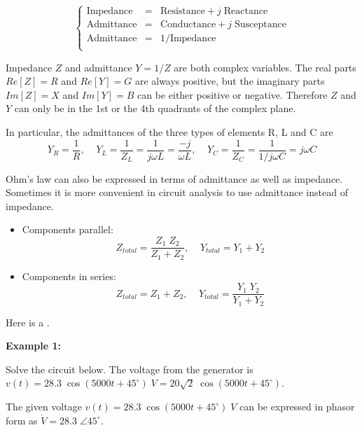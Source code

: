 \documentclass{article}
\begin{document}
\begin{equation}
  \left\{\begin{array}{rcl}
  \mbox{Impedance} &=& \mbox{Resistance} + j \;\mbox{Reactance} \\
  \mbox{Admittance} &=& \mbox{Conductance} + j\; \mbox{Susceptance} \\
  \mbox{Admittance}&=&1/\mbox{Impedance}\\
  \end{array}\right.
\end{equation}

Impedance $Z$ and admittance $Y=1/Z$ are both complex variables. The 
real parts $Re[Z]=R$ and $Re[Y]=G$ are always positive, but the imaginary 
parts $Im[Z]=X$ and $Im[Y]=B$ can be either positive or negative. Therefore
$Z$ and $Y$ can only be in the 1st or the 4th quadrants of the complex plane.

In particular, the admittances of the three types of elements R, L
and C are
\begin{equation}
  Y_R=\frac{1}{R},\;\;\;\;
  Y_L=\frac{1}{Z_L}=\frac{1}{j\omega L}=\frac{-j}{\omega L},\;\;\;\;
  Y_C=\frac{1}{Z_C}=\frac{1}{1/j\omega C}=j\omega C	
\end{equation}

Ohm's law can also be expressed in terms of admittance as well as 
impedance. Sometimes it is more convenient in circuit analysis to use 
admittance instead of impedance.
\begin{itemize}
\item Components parallel:
  \begin{equation} 
    Z_{total}=\frac{Z_1\;Z_2}{Z_1+Z_2},\;\;\;\;Y_{total}=Y_1+Y_2 
  \end{equation}
\item Components in series:
  \begin{equation}
    Z_{total}=Z_1+Z_2,\;\;\;\;Y_{total}=\frac{Y_1\;Y_2}{Y_1+Y_2}
  \end{equation}
\end{itemize}

Here is a 
.


{\bf Example 1:} 

Solve the circuit below. The voltage from the generator is 
$v(t)=28.3\;\cos(5000t+45^\circ)\;V=20\sqrt{2}\;\cos(5000t+45^\circ)$.


The given voltage $v(t)=28.3\;\cos(5000t+45^\circ)\;V$ can be expressed
in phasor form as $\dot{V}=28.3\;\angle{45^\circ}$.
\end{document}
